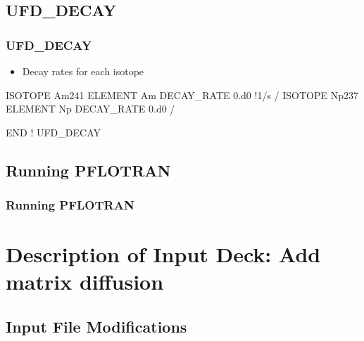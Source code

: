 \documentclass{beamer}
\newcommand\bluecomment[1]{{{\color{blue} #1}}}
\begin{document}
\subsection{UFD\_DECAY}

\begin{frame}[fragile]\frametitle{UFD\_DECAY}
	
\begin{itemize}
\item Decay rates for each isotope
\end{itemize}
	
\begin{semiverbatim}
ISOTOPE Am241
  ELEMENT Am
  DECAY_RATE 0.d0 \bluecomment{!1/s}
/
ISOTOPE Np237
  ELEMENT Np
  DECAY_RATE 0.d0
/

END  \bluecomment{! UFD_DECAY}
		
\end{semiverbatim}
	
\end{frame}

\subsection{Running PFLOTRAN}

\begin{frame}[fragile]\frametitle{Running PFLOTRAN}


\end{frame}

\section{Description of Input Deck: Add matrix diffusion}

\subsection{Input File Modifications}
\end{document}
